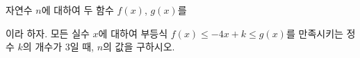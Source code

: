 자연수 $n$에 대하여 두 함수 $f(x)$, $g(x)$를\par\smallskip{}\par\smallskip\noindent 이라 하자. 모든 실수 $x$에 대하여 부등식 $f(x)\le -4x+k\le g(x)$를 만족시키는 정수 $k$의 개수가 $3$일 때, $n$의 값을 구하시오.
